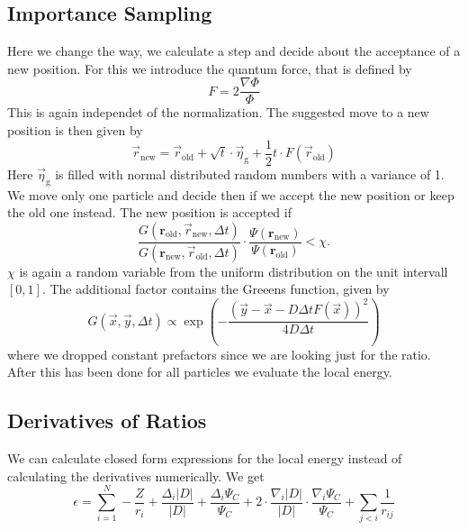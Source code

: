 \documentclass[a4paper,10pt]{article}
\begin{document}
\subsection{Importance Sampling}

Here we change the way, we calculate a step and decide about the acceptance of a new position. For this we introduce the quantum force, that is defined by
\begin{equation}
 F = 2\frac{\nabla \Phi}{\Phi} 
\end{equation}
This is again independet of the normalization. 
The suggested move to a new position is then given by 
\begin{equation}
 \vec{r}_{\mathrm{new}} = \vec{r}_{\mathrm{old}} + \sqrt{t} \cdot \vec{\eta}_{\mathrm{g}} + \frac12 t\cdot  F(\vec{r}_{\mathrm{old}})
\end{equation}
Here $\vec{\eta}_{\mathrm{g}}$ is filled with normal distributed random numbers with a variance of 1. 
We move only one particle and decide then if we accept the new position or keep the old one instead. 
The new position is accepted if 
\begin{equation}
 \frac{G(\mathbf{r}_{\text{old}},\vec{r}_{\text{new}},\Delta t)}
      {G(\mathbf{r}_{\text{new}},\vec{r}_{\text{old}},\Delta t)}
      \cdot
 \frac{\Psi(\mathbf{r}_{\mathrm{new}})}{\Psi(\mathbf{r}_{\mathrm{old}})} < \chi.
\end{equation}
$\chi$ is again a random variable from the uniform distribution on the unit intervall $[0,1]$. 
The additional factor contains the Greeens function, given by
\begin{equation}
 G(\vec{x},\vec{y},\Delta t) \propto \exp \left( -\frac{\left(\vec{y}-\vec{x} -D\Delta t F(\vec{x}) \right)^2 }{4D\Delta t} \right)
\end{equation}
where we dropped constant prefactors since we are looking just for the ratio.
After this has been done for all particles we evaluate the local energy. 
 


\subsection{Derivatives of Ratios}

We can calculate closed form expressions for the local energy instead of calculating the derivatives numerically.
We get
\begin{equation}
 \epsilon = \sum_{i=1}^N -\frac{Z}{r_i} + \frac{\Delta_i |D|}{|D|} + \frac{\Delta_i \Psi_C}{\Psi_C} 
 +2\cdot \frac{\nabla_i |D|}{|D|} \cdot \frac{\nabla_i \Psi_C}{\Psi_C}+ \sum_{j<i} \frac{1}{r_{ij}} 
\end{equation}
\end{document}
